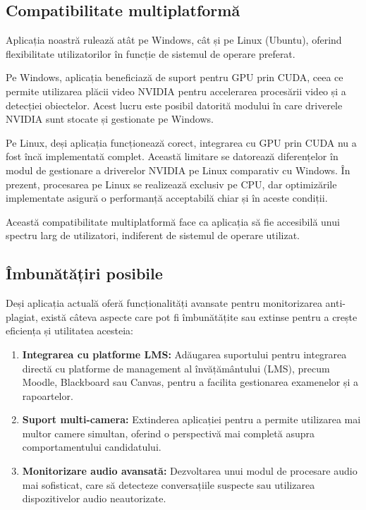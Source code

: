 \documentclass[12pt,a4paper]{article}
\begin{document}
\subsection{Compatibilitate multiplatformă}
Aplicația noastră rulează atât pe Windows, cât și pe Linux (Ubuntu), oferind flexibilitate utilizatorilor în funcție de sistemul de operare preferat. 

Pe Windows, aplicația beneficiază de suport pentru GPU prin CUDA, ceea ce permite utilizarea plăcii video NVIDIA pentru accelerarea procesării video și a detecției obiectelor. Acest lucru este posibil datorită modului în care driverele NVIDIA sunt stocate și gestionate pe Windows.

Pe Linux, deși aplicația funcționează corect, integrarea cu GPU prin CUDA nu a fost încă implementată complet. Această limitare se datorează diferențelor în modul de gestionare a driverelor NVIDIA pe Linux comparativ cu Windows. În prezent, procesarea pe Linux se realizează exclusiv pe CPU, dar optimizările implementate asigură o performanță acceptabilă chiar și în aceste condiții.

Această compatibilitate multiplatformă face ca aplicația să fie accesibilă unui spectru larg de utilizatori, indiferent de sistemul de operare utilizat.

\subsection{Îmbunătățiri posibile}

Deși aplicația actuală oferă funcționalități avansate pentru monitorizarea anti-plagiat, există câteva aspecte care pot fi îmbunătățite sau extinse pentru a crește eficiența și utilitatea acesteia:

\begin{enumerate}
    \item \textbf{Integrarea cu platforme LMS:} Adăugarea suportului pentru integrarea directă cu platforme de management al învățământului (LMS), precum Moodle, Blackboard sau Canvas, pentru a facilita gestionarea examenelor și a rapoartelor.

    \item \textbf{Suport multi-camera:} Extinderea aplicației pentru a permite utilizarea mai multor camere simultan, oferind o perspectivă mai completă asupra comportamentului candidatului.

    \item \textbf{Monitorizare audio avansată:} Dezvoltarea unui modul de procesare audio mai sofisticat, care să detecteze conversațiile suspecte sau utilizarea dispozitivelor audio neautorizate.

\end{enumerate}
\end{document}

